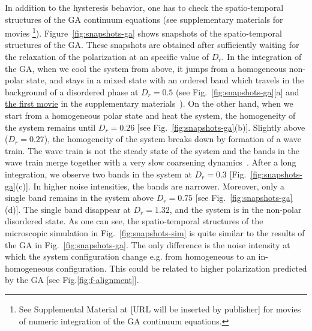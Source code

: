 \documentclass[reprint,floatfix,amsmath,amssymb,aps,pre,showkeys,showpacs,superscriptaddress]{revtex4-1}
\newcommand{\hl}[1]{\textcolor{hlcolor}{#1}}
\begin{document}
In addition to the hysteresis behavior, one has to check the spatio-temporal structures of the GA continuum equations (see supplementary materials for movies \footnote{See Supplemental Material at [URL will be inserted by publisher] for movies of numeric integration of the GA continuum equations.}). Figure~\ref{fig:snapshots-ga} shows snapshots of the spatio-temporal structures of the GA. \hl{These snapshots are obtained after sufficiently waiting for the relaxation of the polarization at an specific value of $D_r$.} In \hl{the} integration of the GA, when we cool the system \hl{from above}, it jumps from a homogeneous non-polar state, \hl{and stays in} a mixed state with an ordered band which travels in the background of a disordered phase \hl{at $D_r=0.5$} (see Fig.~\ref{fig:snapshots-ga}[a] and \href{SI1-cooling-GA.mp4}{the first movie} in the supplementary materials~\cite{Note1}). On the other hand, when we start from a homogeneous polar state and heat the system, the homogeneity of the system remains until $D_r=0.26$ [see Fig.~\ref{fig:snapshots-ga}(b)]. \hl{Slightly above ($D_r=0.27$), the homogeneity of the system breaks down by formation of a wave train. The wave train is not the steady state of the system and the bands in the wave train merge together with a very slow coarsening dynamics~\cite{solon2015pattern}. After a long integration, we observe two bands in the system at $D_r=0.3$ [Fig.~\ref{fig:snapshots-ga}(c)]. In higher noise intensities, the bands are narrower. Moreover, only a single band remains in the system above $D_r=0.75$ [see Fig.~\ref{fig:snapshots-ga}(d)]. The single band disappear at $D_r=1.32$, and the system is in the non-polar disordered state. As one can see, the spatio-temporal structures of the microscopic simulation in Fig.~\ref{fig:snapshots-sim} is quite similar to the results of the GA in Fig.~\ref{fig:snapshots-ga}. The only difference is the noise intensity at which the system configuration change e.g. from homogeneous to an in-homogeneous configuration. This could be related to higher polarization predicted by the GA [see Fig.\ref{fig:f-alignment}].}
\end{document}
